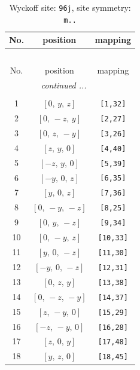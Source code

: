 \documentclass[fleqn,8pt]{jsarticle}
\begin{document}
\begin{longtable}{ccc}
\caption{Wyckoff site: {\tt 96j}, site symmetry: {\tt m..}}
 \\
 \hline \hline
No. & position & mapping \\ \hline \endfirsthead

\multicolumn{2}{l}{\tablename\ \thetable{}} \\
 \hline \hline
No. & position & mapping \\ \hline \endhead

 \hline \hline
\multicolumn{2}{r}{\footnotesize\it continued ...} \\ \endfoot

 \hline \hline
\multicolumn{2}{r}{} \\ \endlastfoot

1 & $\left[ 0,\, y,\, z \right]$ & {\tt [1,32]} \\ \hline
2 & $\left[ 0,\, - z,\, y \right]$ & {\tt [2,27]} \\ \hline
3 & $\left[ 0,\, z,\, - y \right]$ & {\tt [3,26]} \\ \hline
4 & $\left[ z,\, y,\, 0 \right]$ & {\tt [4,40]} \\ \hline
5 & $\left[ - z,\, y,\, 0 \right]$ & {\tt [5,39]} \\ \hline
6 & $\left[ - y,\, 0,\, z \right]$ & {\tt [6,35]} \\ \hline
7 & $\left[ y,\, 0,\, z \right]$ & {\tt [7,36]} \\ \hline
8 & $\left[ 0,\, - y,\, - z \right]$ & {\tt [8,25]} \\ \hline
9 & $\left[ 0,\, y,\, - z \right]$ & {\tt [9,34]} \\ \hline
10 & $\left[ 0,\, - y,\, z \right]$ & {\tt [10,33]} \\ \hline
11 & $\left[ y,\, 0,\, - z \right]$ & {\tt [11,30]} \\ \hline
12 & $\left[ - y,\, 0,\, - z \right]$ & {\tt [12,31]} \\ \hline
13 & $\left[ 0,\, z,\, y \right]$ & {\tt [13,38]} \\ \hline
14 & $\left[ 0,\, - z,\, - y \right]$ & {\tt [14,37]} \\ \hline
15 & $\left[ z,\, - y,\, 0 \right]$ & {\tt [15,29]} \\ \hline
16 & $\left[ - z,\, - y,\, 0 \right]$ & {\tt [16,28]} \\ \hline
17 & $\left[ z,\, 0,\, y \right]$ & {\tt [17,48]} \\ \hline
18 & $\left[ y,\, z,\, 0 \right]$ & {\tt [18,45]} \\ \hline

\end{longtable}
\end{document}
